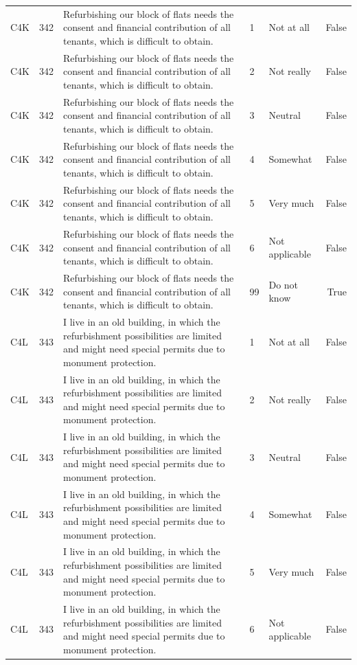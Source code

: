 \begin{tabular}{lrlllr}
C4K & 342 & Refurbishing our block of flats needs the consent and financial contribution of all tenants, which is difficult to obtain. & 1 & Not at all & False \\
C4K & 342 & Refurbishing our block of flats needs the consent and financial contribution of all tenants, which is difficult to obtain. & 2 & Not really & False \\
C4K & 342 & Refurbishing our block of flats needs the consent and financial contribution of all tenants, which is difficult to obtain. & 3 & Neutral & False \\
C4K & 342 & Refurbishing our block of flats needs the consent and financial contribution of all tenants, which is difficult to obtain. & 4 & Somewhat & False \\
C4K & 342 & Refurbishing our block of flats needs the consent and financial contribution of all tenants, which is difficult to obtain. & 5 & Very much & False \\
C4K & 342 & Refurbishing our block of flats needs the consent and financial contribution of all tenants, which is difficult to obtain. & 6 & Not applicable & False \\
C4K & 342 & Refurbishing our block of flats needs the consent and financial contribution of all tenants, which is difficult to obtain. & 99 & Do not know & True \\
C4L & 343 & I live in an old building, in which the refurbishment possibilities are limited and might need special permits due to monument protection. & 1 & Not at all & False \\
C4L & 343 & I live in an old building, in which the refurbishment possibilities are limited and might need special permits due to monument protection. & 2 & Not really & False \\
C4L & 343 & I live in an old building, in which the refurbishment possibilities are limited and might need special permits due to monument protection. & 3 & Neutral & False \\
C4L & 343 & I live in an old building, in which the refurbishment possibilities are limited and might need special permits due to monument protection. & 4 & Somewhat & False \\
C4L & 343 & I live in an old building, in which the refurbishment possibilities are limited and might need special permits due to monument protection. & 5 & Very much & False \\
C4L & 343 & I live in an old building, in which the refurbishment possibilities are limited and might need special permits due to monument protection. & 6 & Not applicable & False \\

\end{tabular}
